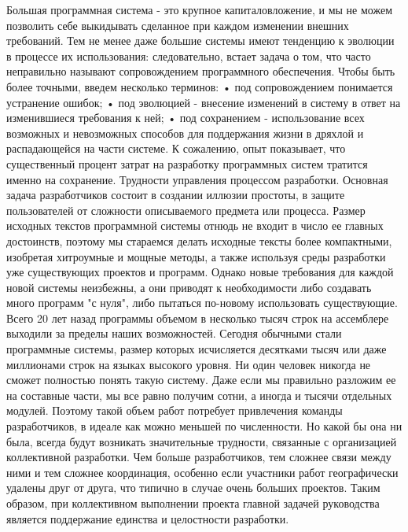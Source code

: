 \documentclass[11pt]{article}
\begin{document}
Большая программная система - это крупное капиталовложение, и мы не можем позволить себе выкидывать сделанное при каждом изменении внешних требований. Тем не менее даже большие системы имеют тенденцию к эволюции в процессе их использования: следовательно, встает задача о том, что часто неправильно называют сопровождением программного обеспечения. Чтобы быть более точными, введем несколько терминов: 
    • под сопровождением понимается устранение ошибок;
    • под эволюцией - внесение изменений в систему в ответ на изменившиеся требования к ней;
    • под сохранением - использование всех возможных и невозможных способов для поддержания жизни в дряхлой и распадающейся на части системе.
К сожалению, опыт показывает, что существенный процент затрат на разработку программных систем тратится именно на сохранение. 
Трудности управления процессом разработки. Основная задача разработчиков состоит в создании иллюзии простоты, в защите пользователей от сложности описываемого предмета или процесса. Размер исходных текстов программной системы отнюдь не входит в число ее главных достоинств, поэтому мы стараемся делать исходные тексты более компактными, изобретая хитроумные и мощные методы, а также используя среды разработки уже существующих проектов и программ. Однако новые требования для каждой новой системы неизбежны, а они приводят к необходимости либо создавать много программ "с нуля", либо пытаться по-новому использовать существующие. Всего 20 лет назад программы объемом в несколько тысяч строк на ассемблере выходили за пределы наших возможностей. Сегодня обычными стали программные системы, размер которых исчисляется десятками тысяч или даже миллионами строк на языках высокого уровня. Ни один человек никогда не сможет полностью понять такую систему. Даже если мы правильно разложим ее на составные части, мы все равно получим сотни, а иногда и тысячи отдельных модулей. Поэтому такой объем работ потребует привлечения команды разработчиков, в идеале как можно меньшей по численности. Но какой бы она ни была, всегда будут возникать значительные трудности, связанные с организацией коллективной разработки. Чем больше разработчиков, тем сложнее связи между ними и тем сложнее координация, особенно если участники работ географически удалены друг от друга, что типично в случае очень больших проектов. Таким образом, при коллективном выполнении проекта главной задачей руководства является поддержание единства и целостности разработки. 
\end{document}
